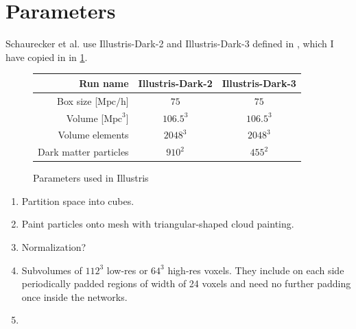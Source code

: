 \section*{Parameters}

Schaurecker et al. \cite{superresolving-halos} use Illustris-Dark-2 and Illustris-Dark-3 defined in \cite{Illustris}, which I have copied in in \cref{Illustris-params}.

\begin{figure}
  \begin{tabular}{rcc}
    \toprule
    Run name & Illustris-Dark-2 & Illustris-Dark-3 \\
    \midrule
    Box size [\(\mathrm{Mpc}/\mathrm{h}\)] & \(75\) & \(75\) \\
    Volume [\(\mathrm{Mpc}^3\)] & \(106.5^3\) & \(106.5^3\) \\
    Volume elements & \(2048^3\) & \(2048^3\) \\
    Dark matter particles & \(910^2\) & \(455^2\) \\
    \bottomrule
  \end{tabular}
  \caption{Parameters used in Illustris}
  \label{Illustris-params}
\end{figure}

\begin{enumerate}
\item Partition space into cubes.
\item Paint particles onto mesh with triangular-shaped cloud painting.
\item Normalization?
\item Subvolumes of \(112^3\) low-res or \(64^3\) high-res voxels. They include on each side periodically padded regions of width of 24 voxels and need no further padding once inside the networks.

\item 
\end{enumerate}


